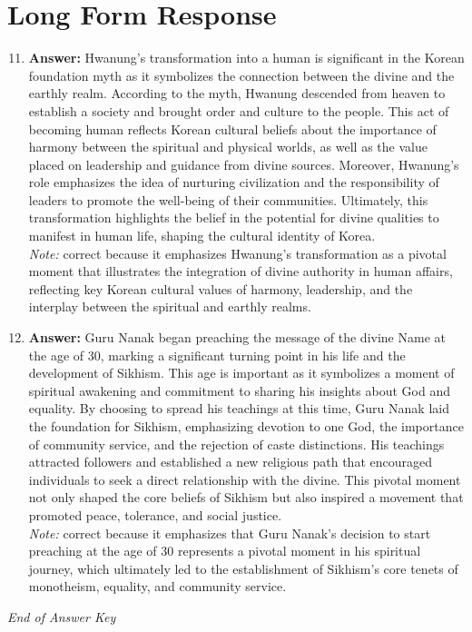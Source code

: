 \documentclass[12pt]{article}
\begin{document}
\section*{Long Form Response}
\begin{enumerate}[label=\arabic*.]
\setcounter{enumi}{10}
\item \textbf{Answer:} Hwanung's transformation into a human is significant in the Korean foundation myth as it symbolizes the connection between the divine and the earthly realm. According to the myth, Hwanung descended from heaven to establish a society and brought order and culture to the people. This act of becoming human reflects Korean cultural beliefs about the importance of harmony between the spiritual and physical worlds, as well as the value placed on leadership and guidance from divine sources. Moreover, Hwanung's role emphasizes the idea of nurturing civilization and the responsibility of leaders to promote the well-being of their communities. Ultimately, this transformation highlights the belief in the potential for divine qualities to manifest in human life, shaping the cultural identity of Korea.
\\ \textit{Note:} correct because it emphasizes Hwanung's transformation as a pivotal moment that illustrates the integration of divine authority in human affairs, reflecting key Korean cultural values of harmony, leadership, and the interplay between the spiritual and earthly realms.
\item \textbf{Answer:} Guru Nanak began preaching the message of the divine Name at the age of 30, marking a significant turning point in his life and the development of Sikhism. This age is important as it symbolizes a moment of spiritual awakening and commitment to sharing his insights about God and equality. By choosing to spread his teachings at this time, Guru Nanak laid the foundation for Sikhism, emphasizing devotion to one God, the importance of community service, and the rejection of caste distinctions. His teachings attracted followers and established a new religious path that encouraged individuals to seek a direct relationship with the divine. This pivotal moment not only shaped the core beliefs of Sikhism but also inspired a movement that promoted peace, tolerance, and social justice.
\\ \textit{Note:} correct because it emphasizes that Guru Nanak's decision to start preaching at the age of 30 represents a pivotal moment in his spiritual journey, which ultimately led to the establishment of Sikhism's core tenets of monotheism, equality, and community service.
\end{enumerate}

\vfill
\noindent\textit{End of Answer Key}
\end{document}
